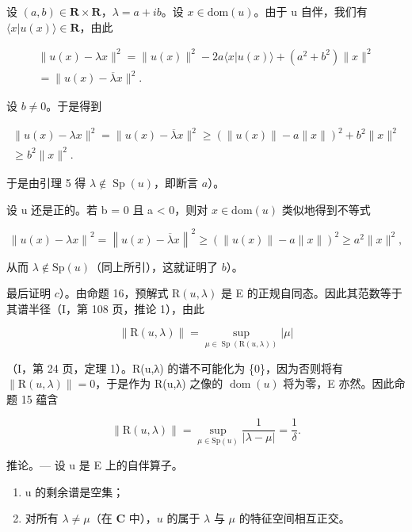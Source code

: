 设 \((a,b)\in\mathbf{R}\times\mathbf{R}\)，\(\lambda=a+ib\)。设 \(x\in\mathrm{dom}(u)\)。由于 u 自伴，我们有 \(\langle x|u(x)\rangle\in\mathbf{R}\)，由此

\[
\begin{array}{r} \| u (x) - \lambda x \| ^ {2} = \| u (x) \| ^ {2} - 2 a \langle x | u (x) \rangle + (a ^ {2} + b ^ {2}) \| x \| ^ {2} \\ = \| u (x) - \overline {{\lambda}} x \| ^ {2}. \end{array}
\]

设 \(b \neq 0\)。于是得到

\[
\begin{array}{c} \| u (x) - \lambda x \| ^ {2} = \| u (x) - \overline {{\lambda}} x \| ^ {2} \geqslant (\| u (x) \| - a \| x \|) ^ {2} + b ^ {2} \| x \| ^ {2} \\ \geqslant b ^ {2} \| x \| ^ {2}. \end{array}
\]

于是由引理 5 得 \(\lambda \notin \operatorname{Sp}(u)\)，即断言 \(a\)）。

设 u 还是正的。若 b = 0 且 a \textless{} 0，则对 \(x \in \text{dom}(u)\) 类似地得到不等式

\[
\left\| u (x) - \lambda x \right\| ^ {2} = \left\| u (x) - \overline {{\lambda}} x \right\| ^ {2} \geqslant \left(\left\| u (x) \right\| - a \| x \|\right) ^ {2} \geqslant a ^ {2} \| x \| ^ {2},
\]

从而 \(\lambda\notin\mathrm{Sp}(u)\)（同上所引），这就证明了 \(b\)）。

最后证明 \(c\)）。由命题 16，预解式 \(\mathrm{R}(u,\lambda)\) 是 E 的正规自同态。因此其范数等于其谱半径（I，第 108 页，推论 1），由此

\[
\| \mathrm{R} (u, \lambda) \| = \sup _ {\mu \in \operatorname{Sp} (\mathrm{R} (u, \lambda))} | \mu |
\]

（I，第 24 页，定理 1）。R(u,λ) 的谱不可能化为 \{0\}，因为否则将有 \(\| \mathrm{R}(u,\lambda)\| = 0\)，于是作为 R(u,λ) 之像的 \(\operatorname{dom}(u)\) 将为零，E 亦然。因此命题 15 蕴含

\[
\| \mathrm{R} (u, \lambda) \| = \sup _ {\mu \in \mathrm{Sp} (u)} \frac {1}{| \lambda - \mu |} = \frac {1}{\delta}.
\]

推论。--- 设 u 是 E 上的自伴算子。

\begin{enumerate}
\def\labelenumi{\alph{enumi})}
\item
  u 的剩余谱是空集；
\item
  对所有 \(\lambda \neq \mu\)（在 \(\mathbf{C}\) 中），\(u\) 的属于 \(\lambda\) 与 \(\mu\) 的特征空间相互正交。
\end{enumerate}

